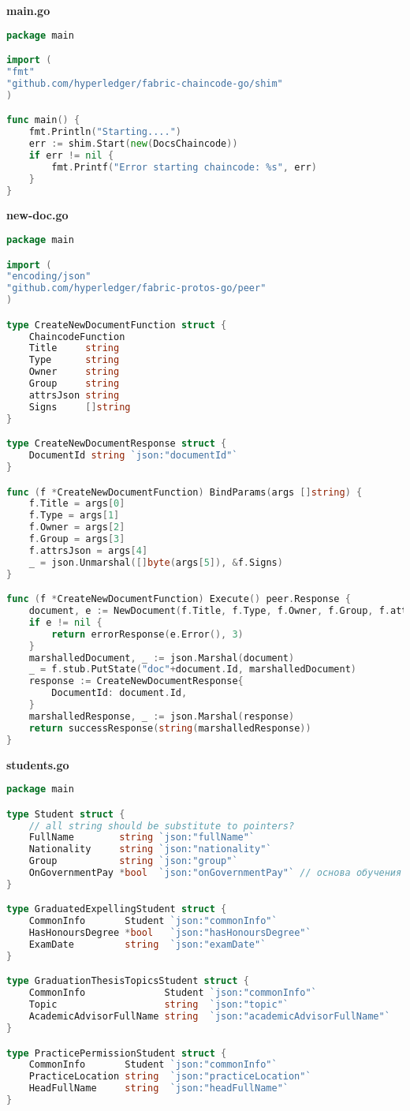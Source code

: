 \textbf{main.go}
\begin{lstlisting}[language=Go]
package main

import (
"fmt"
"github.com/hyperledger/fabric-chaincode-go/shim"
)

func main() {
	fmt.Println("Starting....")
	err := shim.Start(new(DocsChaincode))
	if err != nil {
		fmt.Printf("Error starting chaincode: %s", err)
	}
}

\end{lstlisting}

\textbf{new-doc.go}
\begin{lstlisting}[language=Go]
package main

import (
"encoding/json"
"github.com/hyperledger/fabric-protos-go/peer"
)

type CreateNewDocumentFunction struct {
	ChaincodeFunction
	Title     string
	Type      string
	Owner     string
	Group     string
	attrsJson string
	Signs     []string
}

type CreateNewDocumentResponse struct {
	DocumentId string `json:"documentId"`
}

func (f *CreateNewDocumentFunction) BindParams(args []string) {
	f.Title = args[0]
	f.Type = args[1]
	f.Owner = args[2]
	f.Group = args[3]
	f.attrsJson = args[4]
	_ = json.Unmarshal([]byte(args[5]), &f.Signs)
}

func (f *CreateNewDocumentFunction) Execute() peer.Response {
	document, e := NewDocument(f.Title, f.Type, f.Owner, f.Group, f.attrsJson, f.Signs)
	if e != nil {
		return errorResponse(e.Error(), 3)
	}
	marshalledDocument, _ := json.Marshal(document)
	_ = f.stub.PutState("doc"+document.Id, marshalledDocument)
	response := CreateNewDocumentResponse{
		DocumentId: document.Id,
	}
	marshalledResponse, _ := json.Marshal(response)
	return successResponse(string(marshalledResponse))
}

\end{lstlisting}

\textbf{students.go}
\begin{lstlisting}[language=Go]
package main

type Student struct {
	// all string should be substitute to pointers?
	FullName        string `json:"fullName"`
	Nationality     string `json:"nationality"`
	Group           string `json:"group"`
	OnGovernmentPay *bool  `json:"onGovernmentPay"` // основа обучения бюджет=true\внебюджет=false
}

type GraduatedExpellingStudent struct {
	CommonInfo       Student `json:"commonInfo"`
	HasHonoursDegree *bool   `json:"hasHonoursDegree"`
	ExamDate         string  `json:"examDate"`
}

type GraduationThesisTopicsStudent struct {
	CommonInfo              Student `json:"commonInfo"`
	Topic                   string  `json:"topic"`
	AcademicAdvisorFullName string  `json:"academicAdvisorFullName"`
}

type PracticePermissionStudent struct {
	CommonInfo       Student `json:"commonInfo"`
	PracticeLocation string  `json:"practiceLocation"`
	HeadFullName     string  `json:"headFullName"`
}

\end{lstlisting}

